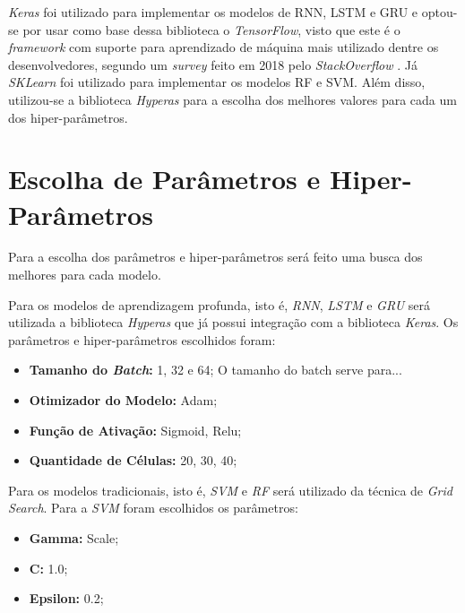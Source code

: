 \textit{Keras} foi utilizado para implementar os modelos de \acrshort{RNN}, \acrshort{LSTM} e \acrshort{GRU} e optou-se por usar como base dessa biblioteca o \textit{TensorFlow}, visto que este é o \textit{framework} com suporte para aprendizado de máquina mais utilizado dentre os desenvolvedores, segundo um \textit{survey} feito em 2018 pelo \textit{StackOverflow} \cite{stack_2018}. Já \textit{SKLearn} foi utilizado para implementar os modelos \acrshort{RF} e \acrshort{SVM}. Além disso, utilizou-se a biblioteca \textit {Hyperas} para a escolha dos melhores valores para cada um dos hiper-parâmetros.

\section{Escolha de Parâmetros e Hiper-Parâmetros}

Para a escolha dos parâmetros e hiper-parâmetros será feito uma busca dos melhores para cada modelo. 

Para os modelos de aprendizagem profunda, isto é, \textit{\acrshort{RNN}}, \textit{\acrshort{LSTM}} e \textit{\acrshort{GRU}} será utilizada a biblioteca \textit{Hyperas} que já possui integração com a biblioteca \textit{Keras}. Os parâmetros e hiper-parâmetros escolhidos foram:


\begin{itemize}
    \item \textbf{Tamanho do \textit{Batch}:} 1, 32 e 64; \newline
    O tamanho do batch serve para...
    \item \textbf{Otimizador do Modelo:} Adam;
    \item \textbf{Função de Ativação:} Sigmoid, Relu;
    \item \textbf{Quantidade de Células:} 20, 30, 40;
\end{itemize}

Para os modelos tradicionais, isto é, \textit{\acrshort{SVM}} e \textit{\acrshort{RF}} será utilizado da técnica de \textit{Grid Search}. Para a \textit{\acrshort{SVM}} foram escolhidos os parâmetros:

\begin{itemize}
    \item \textbf{Gamma:} Scale;
    \item \textbf{C:} 1.0;
    \item \textbf{Epsilon:} 0.2;
\end{itemize}

